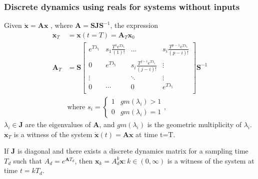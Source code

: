\documentclass[sigconf]{llncs}
\newcommand{\mat}[1]{\boldsymbol{#1}}
\renewcommand{\vec}[1]{\boldsymbol{#1}}
\begin{document}
 \subsubsection{Discrete dynamics using reals for systems without inputs}\label{sec:real_discrete_no_inputs}
 \begin{theorem}
 Given $\dot{\vec{x}}=\mat{A}\vec{x}$ \todo{$\dot{\vec{x}}(t)$?}, where $\mat{A}=\mat{S}\mat{J}\mat{S}^{-1}$, the expression
 \begin{align}
 \vec{x}_T&=\vec{x}(t=T)=\mat{A}_{T}\vec{x}_0\\
 \mat{A}_{T}&= \mat{S}
 \left [ \begin{array}{cccc}
 e^{T\lambda_1}  & s_1\frac{T^{1}e^{T\lambda_i}}{(1)!} & \hdots  & s_i\frac{T^{p-1}e^{T\lambda_i}}{(p-i)!} \\
0 & e^{T\lambda_i}  & s_i\frac{T^{j-i}e^{T\lambda_i}}{(j-i)!} & \vdots \\
\vdots & & \ddots & \vdots \\
0 & \cdots & 0  &e^{T\lambda_i} \\
\end{array} \right ]
 \mat{S}^{-1}
 \label{eq:continuous_tube_dyn}\\
 &\text{where } s_i=\left\{\begin{array}{cc}1&gm(\lambda_i)>1\\0&gm(\lambda_i)=1\end{array}\right.,\nonumber
 \end{align}
$\lambda_i \in \mat{J}$ are the eigenvalues of $\mat{A}$, and $gm(\lambda_i)$ is the geometric multiplicity of $\lambda_i$.  $\vec{x}_T$ is a witness of the system $\dot{\vec{x}}(t)=\mat{A}\vec{x}$ at time t=T.
 \end{theorem}
 \begin{corollary}
 If $\mat{J}$ is diagonal and there exists a discrete dynamics matrix for a sampling time $T_d$ such that $A_d=e^{\mat{A} T_d}$, then $\vec{x}_k=A_d^k\vec{x} : k \in (0,\infty)$ is a witness of the system at time $t=kT_d$.
 \end{corollary}
\end{document}
